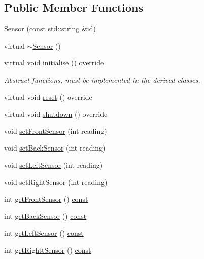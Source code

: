 \subsection*{Public Member Functions}
\begin{DoxyCompactItemize}
\item 
\hyperlink{class_sensor_a8615bafe3f2aa8f8b12b1199eaa577c4}{Sensor} (\hyperlink{functions__c_8js_afacfd9c985d225bb07483b887a801b6f}{const} std\+::string \&id)
\item 
virtual \hyperlink{class_sensor_aa730e9961dd645e9df9644c52b6e72eb}{$\sim$\+Sensor} ()
\item 
virtual void \hyperlink{class_sensor_aa6175cacabc044409786f6d43a72ae29}{initialise} () override
\begin{DoxyCompactList}\small\item\em Abstract functions, must be implemented in the derived classes. \end{DoxyCompactList}\item 
virtual void \hyperlink{class_sensor_a004fc50012f81dbfdce7a2541fa6130d}{reset} () override
\item 
virtual void \hyperlink{class_sensor_a9b3ea7f61f41b68a4fb9141d887a7271}{shutdown} () override
\item 
void \hyperlink{class_sensor_a232cfa2eba02b76485a79c056823add6}{set\+Front\+Sensor} (int reading)
\item 
void \hyperlink{class_sensor_ab473ccb1bf431fa351557c5c9de3dd42}{set\+Back\+Sensor} (int reading)
\item 
void \hyperlink{class_sensor_aa801b7317f2185df148903d99a421555}{set\+Left\+Sensor} (int reading)
\item 
void \hyperlink{class_sensor_af82bc6d823e34180bfcd6e4d33452d2c}{set\+Right\+Sensor} (int reading)
\item 
int \hyperlink{class_sensor_a0e4445ad2a53389b593c0cc980cbd0fa}{get\+Front\+Sensor} () \hyperlink{functions__c_8js_afacfd9c985d225bb07483b887a801b6f}{const} 
\item 
int \hyperlink{class_sensor_a2a6d9722dec48cbd3b1c7868e29f3da6}{get\+Back\+Sensor} () \hyperlink{functions__c_8js_afacfd9c985d225bb07483b887a801b6f}{const} 
\item 
int \hyperlink{class_sensor_a1a10f4b48c98e23a0e65dd161a0f6fd1}{get\+Left\+Sensor} () \hyperlink{functions__c_8js_afacfd9c985d225bb07483b887a801b6f}{const} 
\item 
int \hyperlink{class_sensor_a7e8723c2635a7eff0e130b4ca27451a7}{get\+Rightt\+Sensor} () \hyperlink{functions__c_8js_afacfd9c985d225bb07483b887a801b6f}{const} 

\end{DoxyCompactItemize}
